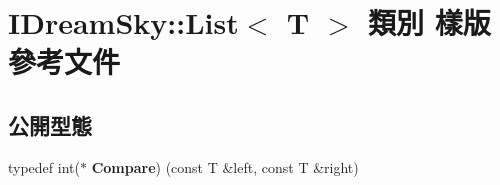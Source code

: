 \hypertarget{class_i_dream_sky_1_1_list}{}\section{I\+Dream\+Sky\+:\+:List$<$ T $>$ 類別 樣版 參考文件}
\label{class_i_dream_sky_1_1_list}
\subsection*{公開型態}
\begin{DoxyCompactItemize}
\item 
typedef int($\ast$ {\bfseries Compare}) (const T \&left, const T \&right)\hypertarget{class_i_dream_sky_1_1_list_a72cb5bd645e75990a2572d28ba5fa38f}{}\label{class_i_dream_sky_1_1_list_a72cb5bd645e75990a2572d28ba5fa38f}

\end{DoxyCompactItemize}
